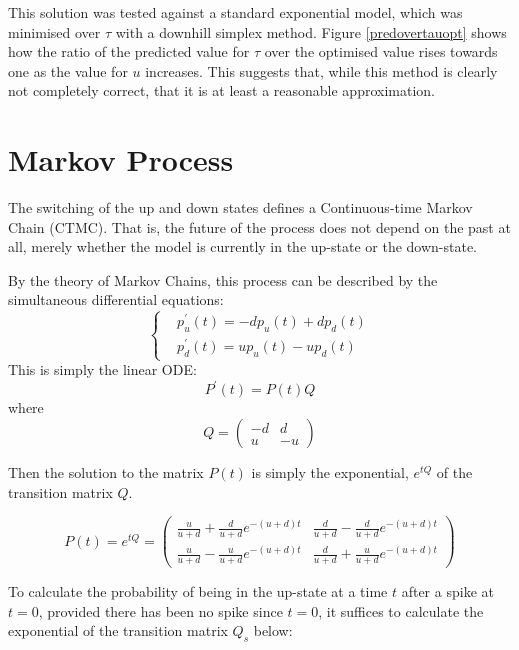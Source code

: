 \documentclass[11pt]{paper}
\begin{document}
This solution was tested against a standard exponential model, which was minimised over $\tau$ with a downhill simplex method.  Figure \ref{predovertauopt} shows how the ratio of the predicted value for $\tau$ over the optimised value rises towards one as the value for $u$ increases.  This suggests that, while this method is clearly not completely correct, that it is at least a reasonable approximation.

\section{Markov Process}

The switching of the up and down states defines a Continuous-time Markov Chain (CTMC).  That is, the future of the process does not depend on the past at all, merely whether the model is currently in the up-state or the down-state.

By the theory of Markov Chains, this process can be described by the simultaneous differential equations:
\begin{equation}
\left\{
\begin{split} &p_u^{\prime}(t) = -dp_u(t) + dp_d(t)\\ &p_d^{\prime}(t)=up_u(t) - up_d(t)
\end{split}
\right.
\end{equation}
This is simply the linear ODE:
\begin{equation}
P^{\prime}(t) = P(t)Q
\end{equation}
where
\begin{equation}
Q =  \begin{pmatrix} -d & d \\ u & -u \end{pmatrix}
\end{equation}

Then the solution to the matrix $P(t)$ is simply the exponential, $e^{tQ}$ of the transition matrix $Q$. 

\begin{equation}
P(t) = e^{tQ} = \begin{pmatrix} \frac{u}{u+d}+\frac{d}{u+d}e^{-(u+d)t} & \frac{d}{u+d} - \frac{d}{u+d}e^{-(u+d)t} \\ \frac{u}{u+d} - \frac{u}{u+d}e^{-(u+d)t} & \frac{d}{u+d} + \frac{u}{u+d}e^{-(u+d)t}\end{pmatrix}
\end{equation}


To calculate the probability of being in the up-state at a time $t$ after a spike at $t=0$, provided there has been no spike since $t=0$, it suffices to calculate the exponential of the transition matrix $Q_s$ below:
\end{document}
